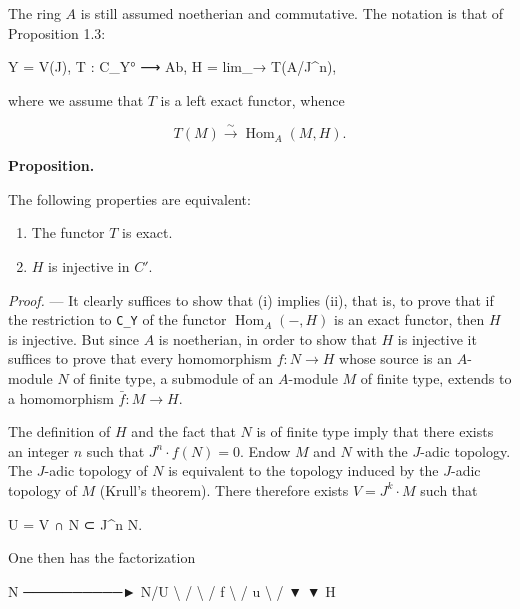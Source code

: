 \documentclass[
]{article}
\newenvironment{Shaded}{}{}
\newcommand{\NormalTok}[1]{#1}
\providecommand{\tightlist}{%
  \setlength{\itemsep}{0pt}\setlength{\parskip}{0pt}}
\begin{document}
The ring \(A\) is still assumed noetherian and commutative. The notation
is that of Proposition 1.3:

\begin{Shaded}
\begin{Highlighting}[]
\NormalTok{Y = V(J),    T : C\_Y° ⟶ Ab,    H = lim\_→ T(A/J\^{}n),}
\end{Highlighting}
\end{Shaded}

where we assume that \(T\) is a left exact functor, whence

\[
T(M) \xrightarrow{\sim} \operatorname{Hom}_{A}(M, H).
\]

\textbf{Proposition.}

The following properties are equivalent:

\begin{enumerate}
\def\labelenumi{\arabic{enumi}.}
\tightlist
\item
  The functor \(T\) is exact.
\item
  \(H\) is injective in \(C'\).
\end{enumerate}

\emph{Proof.} --- It clearly suffices to show that (i) implies (ii),
that is, to prove that if the restriction to \texttt{C\_Y} of the
functor \(\operatorname{Hom}_{A}(-, H)\) is an exact functor, then \(H\)
is injective. But since \(A\) is noetherian, in order to show that \(H\)
is injective it suffices to prove that every homomorphism
\(f : N \to H\) whose source is an \(A\)-module \(N\) of finite type, a
submodule of an \(A\)-module \(M\) of finite type, extends to a
homomorphism \(\bar{f} : M \to H\).

The definition of \(H\) and the fact that \(N\) is of finite type imply
that there exists an integer \(n\) such that \(J^{n} \cdot f(N) = 0\).
Endow \(M\) and \(N\) with the \(J\)-adic topology. The \(J\)-adic
topology of \(N\) is equivalent to the topology induced by the
\(J\)-adic topology of \(M\) (Krull's theorem). There therefore exists
\(V = J^{k} \cdot M\) such that

\begin{Shaded}
\begin{Highlighting}[]
\NormalTok{U = V ∩ N ⊂ J\^{}n N.}
\end{Highlighting}
\end{Shaded}

One then has the factorization

\begin{Shaded}
\begin{Highlighting}[]
\NormalTok{N ──────────► N/U}
\NormalTok{ \textbackslash{}           /}
\NormalTok{  \textbackslash{}         /}
\NormalTok{ f \textbackslash{}       / u}
\NormalTok{    \textbackslash{}     /}
\NormalTok{     ▼   ▼}
\NormalTok{       H}
\end{Highlighting}
\end{Shaded}
\end{document}
